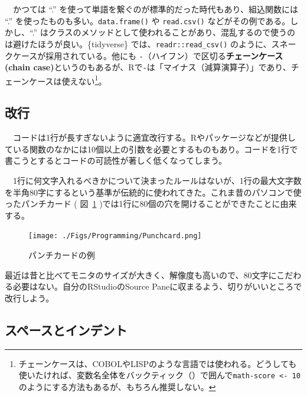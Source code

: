 \documentclass[
  a4paper,
  pandoc,
  ja=standard,
  jafont=haranoaji]{bxjsbook}
\begin{document}
　かつては ``.''
を使って単語を繋ぐのが標準的だった時代もあり、組込関数には ``.''
を使ったものも多い。\texttt{data.frame()} や \texttt{read.csv()}
などがその例である。しかし、``.''
はクラスのメソッドとして使われることがあり、混乱するので使うのは避けたほうが良い。\{tidyverse\}
では、\texttt{readr::read\_csv()}
のように、スネークケースが採用されている。他にも
\texttt{-}（ハイフン）で区切る\textbf{チェーンケース (chain
case)}というのもあるが、Rで\texttt{-}は「マイナス（減算演算子）」であり、チェーンケースは使えない\footnote{チェーンケースは、COBOLやLISPのような言語では使われる。どうしても使いたければ、変数名全体をバックティック（\texttt{\textasciigrave{}}）で囲んで\texttt{\textasciigrave{}math-score\textasciigrave{}\ \textless{}-\ 10}
  のようにする方法もあるが、もちろん推奨しない。}。

\hypertarget{ux6539ux884c}{%
\subsection{改行}\label{ux6539ux884c}}

　コードは1行が長すぎないように適宜改行する。Rやパッケージなどが提供している関数のなかには10個以上の引数を必要とするものもあり。コードを1行で書こうとするとコードの可読性が著しく低くなってしまう。

　1行に何文字入れるべきかについて決まったルールはないが、1行の最大文字数を半角80字にするという基準が伝統的に使われてきた。これま昔のパソコンで使ったパンチカード
( 図~\ref{fig-programming_punchcard}
)では1行に80個の穴を開けることができたことに由来する。

\begin{figure}

{\centering \texttt{[image: ./Figs/Programming/Punchcard.png]}

}

\caption{\label{fig-programming_punchcard}パンチカードの例}

\end{figure}

最近は昔と比べてモニタのサイズが大きく、解像度も高いので、80文字にこだわる必要はない。自分のRStudioのSource
Paneに収まるよう、切りがいいところで改行しよう。

\hypertarget{ux30b9ux30daux30fcux30b9ux3068ux30a4ux30f3ux30c7ux30f3ux30c8}{%
\subsection{スペースとインデント}\label{ux30b9ux30daux30fcux30b9ux3068ux30a4ux30f3ux30c7ux30f3ux30c8}}
\end{document}
